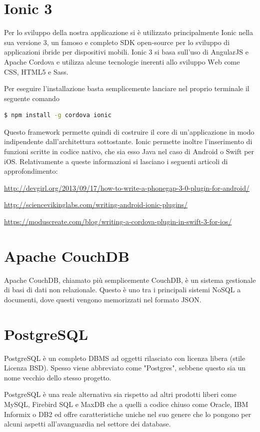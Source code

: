 \documentclass[a4paper,titlepage]{book}
\begin{document}
\section{Ionic 3}
Per lo sviluppo della nostra applicazione si \`{e} utilizzato principalmente Ionic nella sua versione 3, un famoso e completo {\foreignlanguage{english} SDK open-source} per lo sviluppo di applicazioni ibride per dispositivi mobili. 
Ionic 3 si basa sull'uso di AngularJS e Apache Cordova e utilizza alcune tecnologie inerenti allo sviluppo {\foreignlanguage{english} Web} come CSS, HTML5 e Sass.

Per eseguire l'installazione basta semplicemente lanciare nel proprio terminale il seguente comando
\begin{lstlisting}[language=bash]
  $ npm install -g cordova ionic
\end{lstlisting}

Questo framework permette quindi di costruire il core di un'applicazione in modo indipendente dall'architettura sottostante. Ionic permette inoltre l'inserimento di funzioni scritte in codice nativo, che sia esso Java nel caso di Android o Swift per iOS. Relativamente a queste informazioni si lasciano i seguenti articoli di approfondimento:

\url{http://devgirl.org/2013/09/17/how-to-write-a-phonegap-3-0-plugin-for-android/}

\url{http://sciencevikinglabs.com/writing-android-ionic-plugins/}

\url{https://moduscreate.com/blog/writing-a-cordova-plugin-in-swift-3-for-ios/}

\section{Apache CouchDB}
Apache CouchDB, chiamato pi\`{u} semplicemente CouchDB, \`{e} un sistema gestionale di basi di dati non relazionale. Questo \`{e} uno tra i principali sistemi NoSQL a documenti, dove questi vengono memorizzati nel formato JSON.

\section{PostgreSQL}
PostgreSQL \`{e} un completo DBMS ad oggetti rilasciato con licenza libera (stile Licenza BSD). Spesso viene abbreviato come "Postgres", sebbene questo sia un nome vecchio dello stesso progetto.

PostgreSQL \`{e} una reale alternativa sia rispetto ad altri prodotti liberi come MySQL, Firebird SQL e MaxDB che a quelli a codice chiuso come Oracle, IBM Informix o DB2 ed offre caratteristiche uniche nel suo genere che lo pongono per alcuni aspetti all'avanguardia nel settore dei database. 
\end{document}
